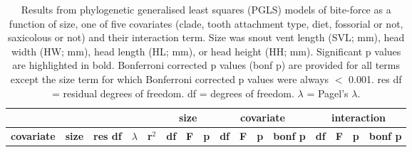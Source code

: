 
\begin{longtable}{lccccccccccccccc}

\caption{Results from phylogenetic generalised least squares (PGLS) models of bite-force as a function of size, one of five covariates (clade, tooth attachment type, diet, fossorial or not, saxicolous or not) and their interaction term. Size was snout vent length (SVL; mm), head width (HW; mm), head length (HL; mm), or head height (HH; mm). Significant p values are highlighted in bold. Bonferroni corrected p values (bonf p) are provided for all terms except the size term for which Bonferroni corrected p values were always $<$ 0.001. res df = residual degrees of freedom. df = degrees of freedom. $\lambda$ = Pagel's $\lambda$.}\\ 


\hline

\multicolumn{5}{c}{} &
\multicolumn{3}{c}{\textbf{size}} &
\multicolumn{4}{c}{\textbf{covariate}} &
\multicolumn{4}{c}{\textbf{interaction}}\\

  \hline
  \textbf{covariate} &
  \textbf{size} &
  \textbf{res df} &
  \textbf{$\lambda$} &
  \textbf{r$^2$} &
  \textbf{df} &
  \textbf{F} &
  \textbf{p} &
  \textbf{df} &
  \textbf{F} &
  \textbf{p} &
  \textbf{bonf p} &
  \textbf{df} &
  \textbf{F} &
  \textbf{p} &
  \textbf{bonf p} \\


\end{longtable}
